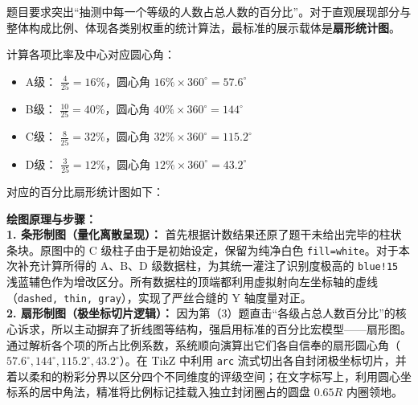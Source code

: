 题目要求突出“抽测中每一个等级的人数占总人数的百分比”。对于直观展现部分与整体构成比例、体现各类别权重的统计算法，最标准的展示载体是\textbf{扇形统计图}。

计算各项比率及中心对应圆心角：
\begin{itemize}
    \item A级： $\frac{4}{25} = 16\%$，圆心角 $16\% \times 360^\circ = 57.6^\circ$
    \item B级： $\frac{10}{25} = 40\%$，圆心角 $40\% \times 360^\circ = 144^\circ$
    \item C级： $\frac{8}{25} = 32\%$，圆心角 $32\% \times 360^\circ = 115.2^\circ$
    \item D级： $\frac{3}{25} = 12\%$，圆心角 $12\% \times 360^\circ = 43.2^\circ$
\end{itemize}

对应的百分比扇形统计图如下：
\begin{center}
\end{center}

\vspace{0.4cm}
{\small\color{blue!70!black}
\textbf{绘图原理与步骤：}\\
\textbf{1. 条形制图（量化离散呈现）：} 首先根据计数结果还原了题干未给出完毕的柱状条块。原图中的 C 级柱子由于是初始设定，保留为纯净白色 \texttt{fill=white}。对于本次补充计算所得的 A、B、D 级数据柱，为其统一灌注了识别度极高的 \texttt{blue!15} 浅蓝辅色作为增改区分。所有数据柱的顶端都利用虚拟射向左坐标轴的虚线（\texttt{dashed, thin, gray}），实现了严丝合缝的 Y 轴度量对正。\\
\textbf{2. 扇形制图（极坐标切片逻辑）：} 因为第（3）题直击“各级占总人数百分比”的核心诉求，所以主动摒弃了折线图等结构，强启用标准的百分比宏模型——扇形图。通过解析各个项的所占比例系数，系统顺向演算出它们各自信奉的扇形圆心角（$57.6^\circ, 144^\circ, 115.2^\circ, 43.2^\circ$）。在 TikZ 中利用 \texttt{arc} 流式切出各自封闭极坐标切片，并着以柔和的粉彩分界以区分四个不同维度的评级空间；在文字标写上，利用圆心坐标系的居中角法，精准将比例标记挂载入独立封闭圈占的圆盘 $0.65R$ 内圈领地。
}

